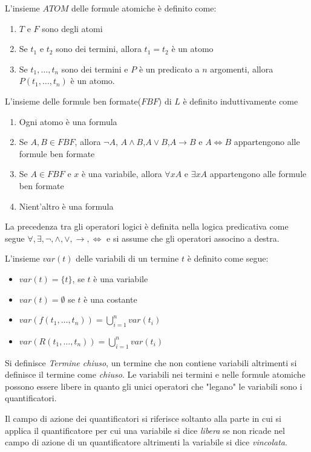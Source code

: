 \begin{defi}
    L'insieme $ATOM$ delle formule atomiche è definito come:
    \begin{enumerate}
        \item $T$ e $F$ sono degli atomi
        \item Se $t_1$ e $t_2$ sono dei termini, allora $t_1 = t_2$ è un atomo
        \item Se $t_1,\dots,t_n$ sono dei termini e $P$ è un predicato a $n$ argomenti,
              allora $P(t_1,\dots,t_n)$ è un atomo.
    \end{enumerate}
\end{defi}

\begin{defi}
    L'insieme delle formule ben formate($FBF$) di $L$ è definito induttivamente come
    \begin{enumerate}
        \item Ogni atomo è una formula
        \item Se $A,B \in FBF$, allora $\neg A$, $A \land B$,$A \lor B$,$A \rightarrow B$
              e $A \iff B$ appartengono alle formule ben formate
        \item Se $A \in FBF$ e $x$ è una variabile, allora $\forall x A$ e $\exists x A$
              appartengono alle formule ben formate
        \item Nient'altro è una formula
    \end{enumerate}
\end{defi}


La precedenza tra gli operatori logici è definita nella logica predicativa come segue
$\forall,\exists,\neg,\land,\lor,\rightarrow,\iff$ e si assume che gli operatori associno a destra.


\begin{defi}
    L'insieme $var(t)$ delle variabili di un termine $t$ è definito come segue:
    \begin{itemize}
        \item $var(t) = \{t \}$, se $t$ è una variabile
        \item $var(t) = \emptyset$ se $t$ è una costante
        \item $var(f(t_1,\dots,t_n)) = \bigcup _{i = 1} ^n var(t_i)$
        \item $var(R(t_1,\dots,t_n)) = \bigcup _{i = 1} ^ n var(t_i)$
    \end{itemize}
\end{defi}

Si definisce \emph{Termine chiuso}, un termine che non contiene variabili altrimenti
si definisce il termine come \emph{chiuso}.\newline
Le variabili nei termini e nelle formule atomiche possono essere libere
 in quanto gli unici operatori che "legano" le variabili sono i quantificatori.

Il campo di azione dei quantificatori si riferisce soltanto alla parte in cui
si applica il quantificatore per cui una variabile si dice \emph{libera}
se non ricade nel campo di azione di un quantificatore altrimenti la variabile si dice \emph{vincolata}.
